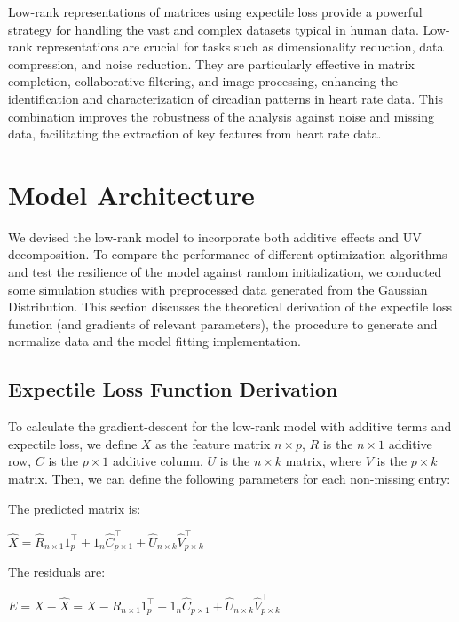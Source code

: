 \documentclass{article}
\begin{document}
Low-rank representations of matrices using expectile loss provide a powerful strategy for handling the vast and complex datasets typical in human data. Low-rank representations are crucial for tasks such as dimensionality reduction, data compression, and noise reduction. They are particularly effective in matrix completion, collaborative filtering, and image processing, enhancing the identification and characterization of circadian patterns in heart rate data. This combination improves the robustness of the analysis against noise and missing data, facilitating the extraction of key features from heart rate data.


\section{Model Architecture}
We devised the low-rank model to incorporate both additive effects and UV decomposition. To compare the performance of different optimization algorithms and test the resilience of the model against random initialization, we conducted some simulation studies with preprocessed data generated from the Gaussian Distribution. This section discusses the theoretical derivation of the expectile loss function (and gradients of relevant parameters), the procedure to generate and normalize data and the model fitting implementation. 

\subsection{Expectile Loss Function Derivation}
To calculate the gradient-descent for the low-rank model with additive terms and expectile loss, 
we define $X$ as the feature matrix $n \times p$, $R$ is the $n \times 1$ additive row, $C$ is the $p \times 1$ additive column. $U$ is the $n \times k$ matrix, where $V $ is the $p \times k$ matrix. Then, we can define the following parameters for each non-missing entry:

The predicted matrix is: 
\begin{center}
    $\hat{X} = \hat{R}_{n \times 1}1^{\top}_{p} + 1_{n}\hat{C}_{p \times 1}^{\top} + \hat{U}_{n \times k}\hat{V}^{\top}_{p \times k}$
\end{center}

The residuals are: 
\begin{center}
    $E = X - \hat{X} = X - \hat{R}_{n \times 1}1^{\top}_{p} + 1_{n}\hat{C}_{p \times 1}^{\top} + \hat{U}_{n \times k}\hat{V}^{\top}_{p \times k}$
\end{center}
\end{document}
